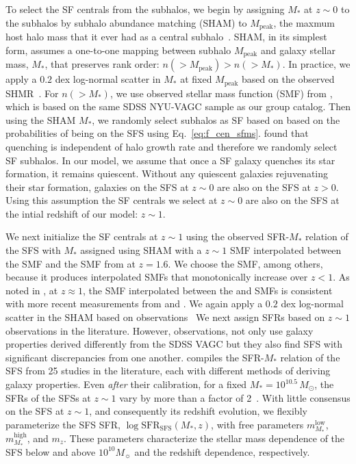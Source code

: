 \documentclass[12pt, letterpaper, preprint, tighten]{aastex62}
\begin{document}
To select the SF centrals from the subhalos, we begin by assigning $M_*$ 
at $z\sim 0$ to the subhalos by subhalo abundance matching (SHAM) to $M_\mathrm{peak}$, 
the maxmum host halo mass that it ever had as a central subhalo~\citep{conroy2006,vale2006,yang2009,wetzel2012,leja2013,wetzel2013,wetzel2014,hahn2017b}. 
SHAM, in its simplest form, assumes a one-to-one mapping between subhalo 
$M_\mathrm{peak}$ and galaxy stellar mass, $M_*$, that preserves rank 
order: $n({>}M_\mathrm{peak}) > n({>}M_*)$. In practice, we apply a $0.2$ 
dex log-normal scatter in $M_*$ at fixed $M_\mathrm{peak}$ based on the 
observed SHMR~\citep[\emph{e.g.}][]{mandelbaum2006a, more2011, velander2014, zu2015, gu2016, lange2018a}. 
For $n({>}M_*)$, we use observed stellar mass function (SMF) 
from \cite{li2009}, which is based on the same SDSS NYU-VAGC sample as our 
group catalog. Then using the SHAM $M_*$, we randomly select subhalos as
SF based on based on the probabilities of being on the SFS using Eq.~\ref{eq:f_cen_sfms}. 
\cite{tinker2017b,tinker2018} found that quenching is 
independent of halo growth rate and therefore we randomly select SF subhalos.  
In our model, we assume that once a SF galaxy quenches its star formation, 
it remains quiescent.  %
Without any quiescent galaxies rejuvenating their star formation, galaxies
on the SFS at $z\sim0$ are also on the SFS at $z > 0$. Using this assumption
the SF centrals we select at $z \sim 0$ are also on the SFS at the intial
redshift of our model: $z \sim 1$. 

We next initialize the SF centrals at $z\sim1$ using the observed SFR-$M_*$ 
relation of the SFS with $M_*$ assigned using SHAM with a $z\sim1$ SMF 
interpolated between the \cite{li2009} SMF and the SMF from \cite{marchesini2009} 
at $z = 1.6$. We choose the \cite{marchesini2009} SMF, among others, because it 
produces interpolated SMFs that monotonically increase over $z < 1$. As noted 
in \cite{hahn2017b}, at $z \approx 1$, the SMF interpolated between the 
\cite{li2009} and \cite{marchesini2009} SMFs is consistent with more recent 
measurements from \cite{muzzin2013} and \cite{ilbert2013}. We again apply a 
$0.2$ dex log-normal scatter in the SHAM based on observations~\citep[\emph{e.g.}][]{leauthaud2012, tinker2013, patel2015}
We next assign SFRs based on $z \sim 1$ observations in the literature. 
However, observations, not only use galaxy properties derived differently 
from the SDSS VAGC but they also find SFS with significant discrepancies 
from one another. \cite{speagle2014} compiles the SFR-$M_*$ relation of the 
SFS from 25 studies in the literature, each with different methods of deriving 
galaxy properties. Even \emph{after} their calibration, for a fixed 
$M_* = 10^{10.5}\, M_\odot$, the SFRs of the SFSs at $z \sim 1$ 
vary by more than a factor of 2~\citep[see Figure 2 of][]{speagle2014}. 
With little consensus on the SFS at $z\sim1$, and consequently its redshift
evolution, we flexibly parameterize the SFS SFR, 
$\log\mathrm{SFR}_\mathrm{SFS}(M_*, z)$, 
with free parameters $m^\mathrm{low}_{M_*}$, $m^\mathrm{high}_{M_*}$, and 
$m_z$. These parameters characterize the stellar mass dependence of the SFS 
below and above $10^{10} M_\sun$ and the redshift dependence, respectively. 
\end{document}
